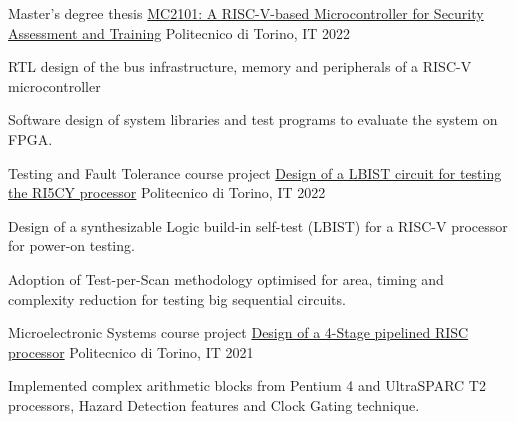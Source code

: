 

\begin{cventries}

  \cventry
    {Master's degree thesis} %
    {\href{https://github.com/Luca-Dalmasso/Thesis}{MC2101: A RISC-V-based Microcontroller for Security Assessment and Training}} %
    {Politecnico di Torino, IT} %
    {2022} %
    {
      \begin{cvitems} %
        \item{RTL design of the bus infrastructure, memory and peripherals of a RISC-V microcontroller}
        \item{Software design of system libraries and test programs to evaluate the system on FPGA.}
      \end{cvitems}
    }
    
  \cventry
    {Testing and Fault Tolerance course project} %
    {\href{https://github.com/Luca-Dalmasso/RISCV_LBIST}{Design of a LBIST circuit for testing the RI5CY processor}} %
    {Politecnico di Torino, IT} %
    {2022} %
    {
      \begin{cvitems} %
        \item{Design of a synthesizable Logic build-in self-test (LBIST) for a RISC-V processor for power-on testing}.
        \item{Adoption of Test-per-Scan methodology optimised for area, timing and complexity reduction for testing big sequential circuits.}
      \end{cvitems}
    }

  \cventry
    {Microelectronic Systems course project} %
    {\href{https://github.com/Luca-Dalmasso/DLX}{Design of a 4-Stage pipelined RISC processor}} %
    {Politecnico di Torino, IT} %
    {2021} %
    {
      \begin{cvitems} %
        \item{Implemented complex arithmetic blocks from Pentium 4 and UltraSPARC T2 processors, Hazard Detection features and Clock Gating technique.}
      \end{cvitems}
    }

\end{cventries}
